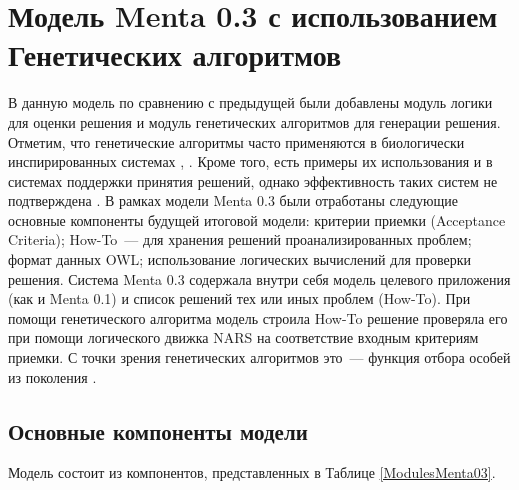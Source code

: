 \section{Модель Menta 0.3 с использованием Генетических алгоритмов} \label{chapt2}
В данную модель по сравнению с предыдущей были добавлены модуль логики для оценки решения и модуль генетических алгоритмов для генерации решения. Отметим, что генетические алгоритмы часто применяются в биологически инспирированных системах \cite{G1}, \cite{G3}. Кроме того, есть примеры их использования и в системах поддержки принятия решений, однако эффективность таких систем не подтверждена \cite{G2}. В рамках модели Menta 0.3 были отработаны следующие основные компоненты будущей итоговой модели: критерии приемки (Acceptance Criteria); How-To~--- для хранения решений проанализированных проблем; формат данных OWL; использование логических вычислений для проверки решения. Система Menta 0.3 содержала внутри себя модель целевого приложения (как и Menta 0.1) и список решений тех или иных проблем (How-To). При помощи генетического алгоритма модель строила How-To решение проверяла его при помощи логического движка NARS \cite{NARS} на соответствие входным критериям приемки. С точки зрения генетических алгоритмов это~--- функция отбора особей из поколения \cite{GFITNESS}. 

\subsection{Основные компоненты модели}
Модель состоит из компонентов, представленных в Таблице \ref{ModulesMenta03}.


